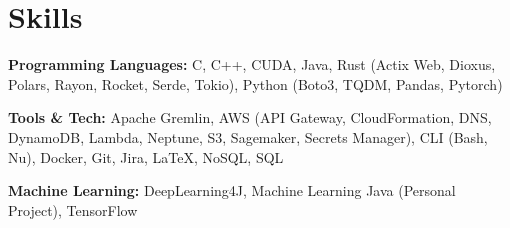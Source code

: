 ﻿
\section{Skills}

\textbf{Programming Languages: } C, C++, CUDA, Java, Rust (Actix Web, Dioxus, Polars, Rayon, Rocket, Serde, Tokio), Python (Boto3, TQDM, Pandas, Pytorch)

\bigbreak

\textbf{Tools \& Tech: } Apache Gremlin, AWS (API Gateway, CloudFormation, DNS, DynamoDB, Lambda, Neptune, S3, Sagemaker, Secrets Manager), CLI (Bash, Nu), Docker, Git, Jira, \LaTeX, NoSQL, SQL

\bigbreak

\textbf{Machine Learning: } DeepLearning4J, Machine Learning Java (Personal Project), TensorFlow